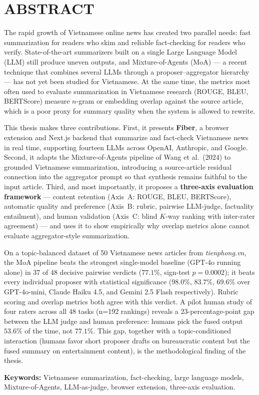 \chapter*{ABSTRACT}

The rapid growth of Vietnamese online news has created two parallel needs:
fast summarization for readers who skim and reliable fact-checking for readers who
verify. State-of-the-art summarizers built on a single Large Language Model (LLM)
still produce uneven outputs, and Mixture-of-Agents (MoA) --- a recent technique
that combines several LLMs through a proposer--aggregator hierarchy ---
has not yet been studied for Vietnamese. At the same time, the metrics most often
used to evaluate summarization in Vietnamese research (ROUGE, BLEU, BERTScore)
measure $n$-gram or embedding overlap against the source article, which is a poor
proxy for summary quality when the system is allowed to rewrite.

This thesis makes three contributions. First, it presents \textbf{Fiber}, a
browser extension and Next.js backend that summarize and fact-check Vietnamese
news in real time, supporting fourteen LLMs across OpenAI, Anthropic, and
Google. Second, it adapts the Mixture-of-Agents pipeline of Wang et al.\ (2024)
to grounded Vietnamese summarization, introducing a source-article residual
connection into the aggregator prompt so that synthesis remains faithful to the
input article. Third, and most importantly, it proposes a
\textbf{three-axis evaluation framework} --- content retention (Axis~A: ROUGE,
BLEU, BERTScore), automatic quality and preference (Axis~B: rubric, pairwise
LLM-judge, factuality entailment), and human validation (Axis~C: blind $K$-way
ranking with inter-rater agreement) --- and uses it to show empirically why
overlap metrics alone cannot evaluate aggregator-style summarization.

On a topic-balanced dataset of 50 Vietnamese news articles from
\textit{tienphong.vn}, the MoA pipeline beats the strongest single-model
baseline (GPT-4o running alone) in $37$ of $48$ decisive pairwise verdicts
($77.1\%$, sign-test $p = 0.0002$); it beats every individual proposer with
statistical significance ($98.0\%$, $83.7\%$, $69.6\%$ over GPT-4o-mini,
Claude Haiku 4.5, and Gemini 2.5 Flash respectively). Rubric scoring and overlap
metrics both agree with this verdict. A pilot human study of four raters across
all $48$ tasks (n=192 rankings) reveals a $23$-percentage-point gap between the
LLM judge and human preference: humans pick the fused output $53.6\%$ of the
time, not $77.1\%$. This gap, together with a topic-conditioned interaction
(humans favor short proposer drafts on bureaucratic content but the fused
summary on entertainment content), is the methodological finding of the thesis.

\vspace{0.4em}
\textbf{Keywords:} Vietnamese summarization, fact-checking, large language
models, Mixture-of-Agents, LLM-as-judge, browser extension, three-axis
evaluation.
